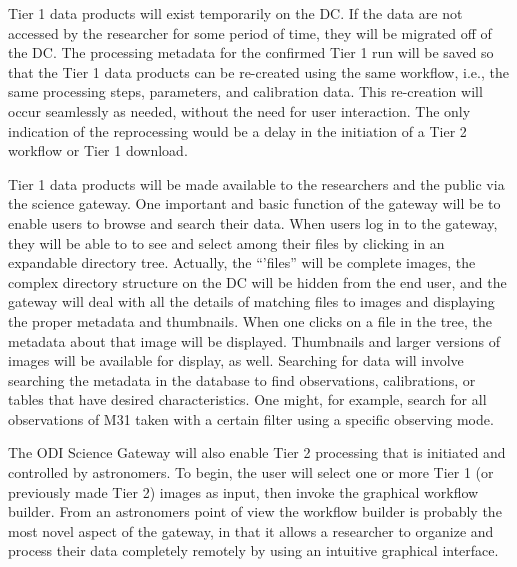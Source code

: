 \documentclass[10pt,conference]{IEEEtran}
\begin{document}
Tier 1 data products will exist temporarily on the DC. If the data are not accessed by the researcher for some period of time, they will be migrated off of the DC. The processing metadata for the confirmed Tier 1 run will be saved so that the Tier 1 data products can be re-created using the same workflow, i.e., the same processing steps, parameters, and calibration data. This re-creation will occur seamlessly as needed, without the need for user interaction. The only indication of the reprocessing would be a delay in the initiation of a Tier 2 workflow or Tier 1 download.

Tier 1 data products will be made available to the researchers and the public via the science gateway. One important and basic function of the gateway will be to enable users to browse and search their data.  When users log in to the gateway, they will be able to to see and select among their files by clicking in an expandable directory tree. Actually, the ``'files'' will be complete images, the complex directory structure on the DC will be hidden from the end user, and the gateway will deal with all the details of matching files to images and displaying the proper metadata and thumbnails. When one clicks on a file in the tree, the metadata about that image will be displayed. Thumbnails and larger versions of images will be available for display, as well.  
Searching for data will involve searching the metadata in the database to find observations, calibrations, or tables that have desired characteristics. One might, for example, search for all observations of M31 taken with a certain filter using a specific observing mode.

The ODI Science Gateway will also enable Tier 2 processing that is initiated and controlled by astronomers. To begin, the user will select one or more Tier 1 (or previously made Tier 2) images as input, then invoke the graphical workflow builder. From an astronomers point of view the workflow builder is probably the most novel aspect of the gateway, in that it allows a researcher to organize and process their data completely remotely by using an intuitive graphical interface.
\end{document}
